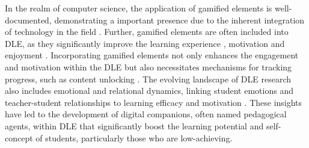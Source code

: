 In the realm of computer science, the application of gamified elements is well-documented, demonstrating a important presence due to the inherent integration of technology in the field \parencite{dichevGamifyingEducationWhat2017}.
Further, gamified elements are often included into DLE, as they significantly improve the learning experience \parencite{dermevalGaTOOntologicalModel2019}, motivation and enjoyment \parencite{gonzalezGamificationIntelligentTutoring2014, jacksonMotivationPerformanceGamebased2013}.
Incorporating gamified elements not only enhances the engagement and motivation within the DLE but also necessitates mechanisms for tracking progress, such as content unlocking \parencite{gonzalezGamificationIntelligentTutoring2014}.
The evolving landscape of DLE research also includes emotional and relational dynamics, linking student emotions and teacher-student relationships to learning efficacy and motivation \parencite{woolfAffectiveTutorsAutomatic2010}.
These insights have led to the development of digital companions, often named pedagogical agents, within DLE that significantly boost the learning potential and self-concept of students, particularly those who are low-achieving.

